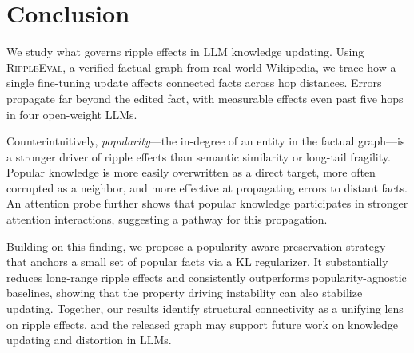 \section{Conclusion}

We study what governs ripple effects in LLM knowledge updating.
Using \textsc{RippleEval}, a verified factual graph from real-world
Wikipedia, we trace how a single fine-tuning update affects connected
facts across hop distances. Errors propagate far beyond the edited
fact, with measurable effects even past five hops in four open-weight
LLMs.

Counterintuitively, \emph{popularity}—the in-degree of an entity in
the factual graph—is a stronger driver of ripple effects than
semantic similarity or long-tail fragility. Popular knowledge is
more easily overwritten as a direct target, more often corrupted as
a neighbor, and more effective at propagating errors to distant
facts. An attention probe further shows that popular knowledge
participates in stronger attention interactions, suggesting a
pathway for this propagation.

Building on this finding, we propose a popularity-aware preservation
strategy that anchors a small set of popular facts via a KL
regularizer. It substantially reduces long-range ripple effects and
consistently outperforms popularity-agnostic baselines, showing that
the property driving instability can also stabilize updating.
Together, our results identify structural connectivity as a unifying
lens on ripple effects, and the released graph may support future
work on knowledge updating and distortion in LLMs.
